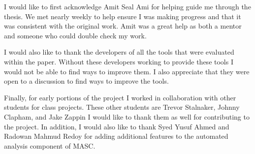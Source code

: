 \begin{large}
\begin{flushleft}
\noindent I would like to first acknowledge Amit Seal Ami for helping guide me through the thesis. We met nearly weekly to help ensure I was making progress and that it was consistent with the original work. Amit was a great help as both a mentor and someone who could double check my work. \\
\end{flushleft}

\begin{flushleft}
\noindent I would also like to thank the developers of all the tools that were evaluated within the paper. Without these developers working to provide these tools I would not be able to find ways to improve them. I also appreciate that they were open to a discussion to find ways to improve the tools.\\
\end{flushleft}

\begin{flushleft}
\noindent Finally, for early portions of the project I worked in collaboration with other students for class projects. These other students are Trevor Stalnaker, Johnny Clapham, and Jake Zappin I would like to thank them as well for contributing to the project. In addition, I would also like to thank Syed Yusuf Ahmed and Radowan Mahmud Redoy for adding additional features to the automated analysis component of MASC.\\
\end{flushleft}


\end{large}